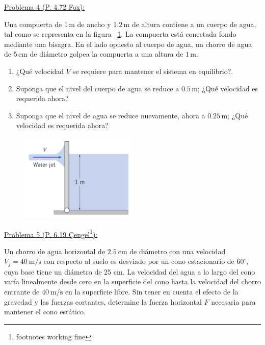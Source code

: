 \documentclass[11pt]{report}
\begin{document}
\vspace{1cm}

\underline {Problema 4 (P. 4.72 Fox):}

Una compuerta de $1$\,m de ancho y $1.2$\,m de altura contiene a un cuerpo de agua, tal  como se representa en la figura ~\ref{fig:fig4}. La compuerta est\'a conectada fondo mediante una bisagra. En el lado opuesto al cuerpo de agua, un chorro de agua de $5$\,cm de di\'ametro golpea la compuerta a una altura de $1$\,m. 

\begin{enumerate}[label=\alph*)]
\item ¿Qu\'e velocidad $V$ se requiere para mantener el sistema en equilibrio?.
\item Suponga que el nivel del cuerpo de agua se reduce a $0.5$\,m; ¿Qu\'e velocidad es requerida ahora?
\item Suponga que el nivel de agua se reduce nuevamente, ahora a $0.25$\,m; ¿Qu\'e velocidad es requerida ahora?
\end{enumerate}

\begin{figure}[H]
\centering\includegraphics[width=0.5\textwidth]{Figures/p4.png}
\caption{\label{fig:fig4}}
\end{figure}
%
%
\newpage


\vspace{1cm}

\underline {Problema 5 (P. 6.19 Çengel\footnote{footnotes working fine}):}

Un chorro de agua horizontal de $2.5 \mathrm{~cm}$ de diámetro con una velocidad $V_{j}=40 \mathrm{~m} / \mathrm{s}$ con respecto al suelo es desviado por un cono estacionario de $60^{\circ}$, cuya base tiene un diámetro de 25 cm. La velocidad del agua a lo largo del cono varía linealmente desde cero en la superficie del cono hasta la velocidad del chorro entrante de $40 \mathrm{~m} / \mathrm{s}$ en la superficie libre. Sin tener en cuenta el efecto de la gravedad y las fuerzas cortantes, determine la fuerza horizontal $F$ necesaria para mantener el cono estático.
\end{document}
